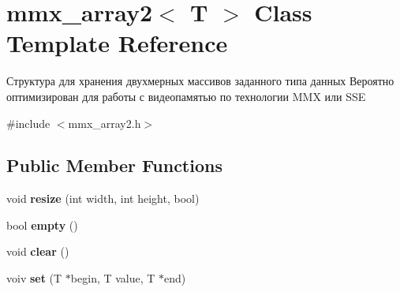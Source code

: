 \hypertarget{classmmx__array2}{\section{mmx\+\_\+array2$<$ T $>$ Class Template Reference}
\label{classmmx__array2}
}


Структура для хранения двухмерных массивов заданного типа данных Вероятно оптимизирован для работы с видеопамятью по технологии M\+M\+X или S\+S\+E  




{\ttfamily \#include $<$mmx\+\_\+array2.\+h$>$}

\subsection*{Public Member Functions}
\begin{DoxyCompactItemize}
\item 
\hypertarget{classmmx__array2_ab91171378bb852edb5c539ff9f1b1ba0}{void {\bfseries resize} (int width, int height, bool)}\label{classmmx__array2_ab91171378bb852edb5c539ff9f1b1ba0}

\item 
\hypertarget{classmmx__array2_a5fa7fe8a409091b6d1ae664a80552307}{bool {\bfseries empty} ()}\label{classmmx__array2_a5fa7fe8a409091b6d1ae664a80552307}

\item 
\hypertarget{classmmx__array2_a67c8a4790849f483deb9a7113f78a178}{void {\bfseries clear} ()}\label{classmmx__array2_a67c8a4790849f483deb9a7113f78a178}

\item 
\hypertarget{classmmx__array2_a94c4f955e93cefb4d8cd072669d981bb}{voiv {\bfseries set} (T $\ast$begin, T value, T $\ast$end)}\label{classmmx__array2_a94c4f955e93cefb4d8cd072669d981bb}

\end{DoxyCompactItemize}
